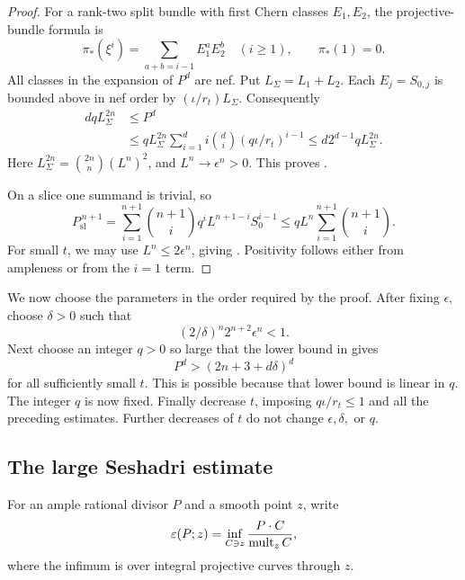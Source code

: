 \begin{proof}
For a rank-two split bundle with first Chern classes \(E_1,E_2\),
the projective-bundle formula is
\[
 \pi_*(\xi^i)=\sum_{a+b=i-1}E_1^aE_2^b\quad(i\ge1),
 \qquad \pi_*(1)=0 .
\]
All classes in the expansion of \(P^d\) are nef. Put
\(L_\Sigma=L_1+L_2\). Each \(E_j=S_{0,j}\) is bounded above in nef
order by \((\iota/r_t)L_\Sigma\). Consequently
\begin{align*}
 d qL_\Sigma^{2n}
 &\le P^d\\
 &\le
 qL_\Sigma^{2n}
 \sum_{i=1}^d i\binom di(q\iota/r_t)^{i-1}
 \le d2^{d-1}qL_\Sigma^{2n}.
\end{align*}
Here \(L_\Sigma^{2n}=\binom{2n}{n}(L^n)^2\), and
\(L^n\to\epsilon^n>0\). This proves
.

On a slice one summand is trivial, so
\[
 P_{\mathrm{sl}}^{\,n+1}
 =\sum_{i=1}^{n+1}\binom{n+1}{i}
 q^i L^{n+1-i}S_0^{i-1}
 \le qL^n\sum_{i=1}^{n+1}\binom{n+1}{i}.
\]
For small \(t\), we may use \(L^n\le2\epsilon^n\), giving
. Positivity follows either from
ampleness or from the \(i=1\) term.
\end{proof}

We now choose the parameters in the order required by the proof.
After fixing \(\epsilon\), choose \(\delta>0\) such that
\begin{equation}\label{eq:two-slot-gap-choice}
 (2/\delta)^n2^{n+2}\epsilon^n<1 .
\end{equation}
Next choose an integer \(q>0\) so large that the lower bound in
 gives
\begin{equation}\label{eq:two-slot-jet-volume}
 P^d>(2n+3+d\delta)^d
\end{equation}
for all sufficiently small \(t\). This is possible because that
lower bound is linear in \(q\). The integer \(q\) is now fixed.
Finally decrease \(t\), imposing \(q\iota/r_t\le1\) and all the
preceding estimates. Further decreases of \(t\) do not change
\(\epsilon,\delta,\) or \(q\).

\subsection{The large Seshadri estimate}

For an ample rational divisor \(P\) and a smooth point \(z\), write
\[
 \varepsilon(P;z)
 =\inf_{C\ni z}\frac{P\cdot C}{\operatorname{mult}_z C},
\]
where the infimum is over integral projective curves through \(z\).


